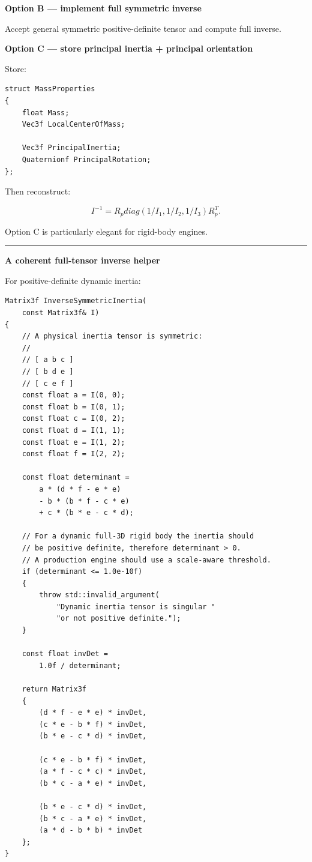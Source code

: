 \textbf{Option B --- implement full symmetric inverse}

Accept general symmetric positive-definite tensor and compute full inverse.

\textbf{Option C --- store principal inertia + principal orientation}

Store:

\begin{verbatim}
struct MassProperties
{
    float Mass;
    Vec3f LocalCenterOfMass;

    Vec3f PrincipalInertia;
    Quaternionf PrincipalRotation;
};
\end{verbatim}

Then reconstruct:

\[
I^{-1}
=
R_p
diag(
1/I_1,
1/I_2,
1/I_3)
R_p^T.
\]

Option C is particularly elegant for rigid-body engines.

\begin{center}\rule{0.5\linewidth}{0.5pt}\end{center}

\textbf{A coherent full-tensor inverse helper}

For positive-definite dynamic inertia:

\begin{verbatim}
Matrix3f InverseSymmetricInertia(
    const Matrix3f& I)
{
    // A physical inertia tensor is symmetric:
    //
    // [ a b c ]
    // [ b d e ]
    // [ c e f ]
    const float a = I(0, 0);
    const float b = I(0, 1);
    const float c = I(0, 2);
    const float d = I(1, 1);
    const float e = I(1, 2);
    const float f = I(2, 2);

    const float determinant =
        a * (d * f - e * e)
        - b * (b * f - c * e)
        + c * (b * e - c * d);

    // For a dynamic full-3D rigid body the inertia should
    // be positive definite, therefore determinant > 0.
    // A production engine should use a scale-aware threshold.
    if (determinant <= 1.0e-10f)
    {
        throw std::invalid_argument(
            "Dynamic inertia tensor is singular "
            "or not positive definite.");
    }

    const float invDet =
        1.0f / determinant;

    return Matrix3f
    {
        (d * f - e * e) * invDet,
        (c * e - b * f) * invDet,
        (b * e - c * d) * invDet,

        (c * e - b * f) * invDet,
        (a * f - c * c) * invDet,
        (b * c - a * e) * invDet,

        (b * e - c * d) * invDet,
        (b * c - a * e) * invDet,
        (a * d - b * b) * invDet
    };
}
\end{verbatim}

